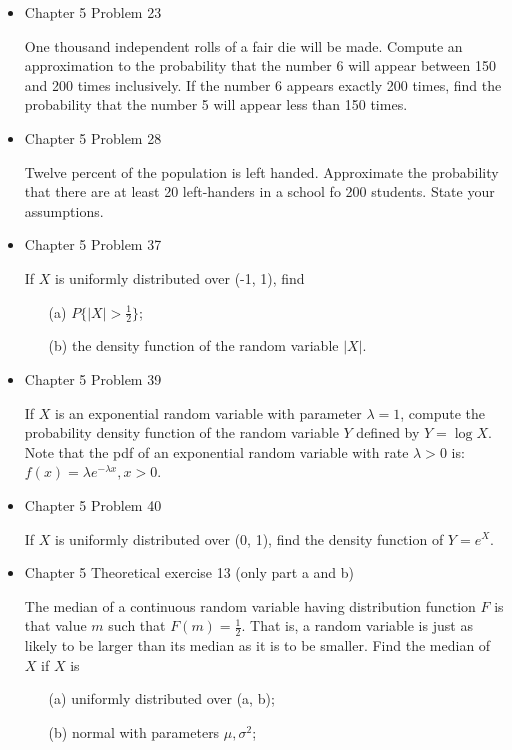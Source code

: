 \documentclass[11pt]{article}
\begin{document}
\begin{itemize}
    \item
    Chapter 5 Problem 23
    
    One thousand independent rolls of a fair die will be made. Compute an approximation to the probability that the number 6 will appear between 150 and 200 times inclusively. If the number 6 appears exactly 200 times, find the probability that the number 5 will appear less than 150 times.
    
    \item 
    Chapter 5 Problem 28
    
    Twelve percent of the population is left handed. Approximate the probability that there are at least 20 left-handers in a school fo 200 students. State your assumptions.
    
    \item 
    Chapter 5 Problem 37
    
    If $X$ is uniformly distributed over (-1, 1), find
    
    \begin{itemize}
    \item[(a)] $P\{|X| > \frac{1}{2}\}$;
    \item[(b)] the density function of the random variable $|X|$.
    \end{itemize}
    
    \item 
    Chapter 5 Problem 39
    
    If $X$ is an exponential random variable with parameter $\lambda = 1$, compute the probability density function of the random variable $Y$ defined by $Y = \log X$. Note that the pdf of an exponential random variable with rate $\lambda > 0$ is: $f(x) = \lambda e^{-\lambda x}, x > 0$.
    
    \item 
    Chapter 5 Problem 40
    
    If $X$ is uniformly distributed over (0, 1), find the density function of $Y = e^X$.
    

    \item 
    Chapter 5 Theoretical exercise 13 (only part a and b)
    
    The median of a continuous random variable having distribution function $F$ is that value $m$ such that $F(m) = \frac{1}{2}$. That is, a random variable is just as likely to be larger than its median as it is to be smaller. Find the median of $X$ if $X$ is
    
    \begin{itemize}
    \item[(a)] uniformly distributed over (a, b);
    \item[(b)] normal with parameters $\mu, \sigma^2$;
    \end{itemize}
    

\end{itemize}
\end{document}
